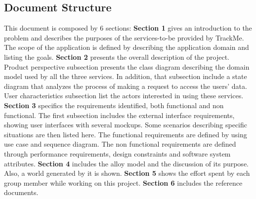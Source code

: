 \subsection{Document Structure}
This document is composed by 6 sections:
\bigbreak
\noindent
\textbf{Section 1} gives an introduction to the problem and describes the purposes of the services-to-be provided by TrackMe. The scope of the application is defined by describing the application domain and listing the goals.
\bigbreak
\noindent
\textbf{Section 2} presents the overall description of the project. Product perspective subsection presents the class diagram describing the domain model used by all the three services. In addition, that subsection include a state diagram that analyzes the process of making a request to access the users' data. User characteristics subsection list the actors interested in using these services.
\bigbreak
\noindent
\textbf{Section 3} specifics the requirements identified, both functional and non functional. The first subsection includes the external interface requirements, showing user interfaces with several mockups. Some scenarios describing specific situations are then listed here. The functional requirements are defined by using use case and sequence diagram. The non functional requirements are defined through performance requirements, design constraints and software system attributes.
\bigbreak
\noindent
\textbf{Section 4} includes the alloy model and the discussion of its purpose. Also, a world generated by it is shown.
\bigbreak
\noindent
\textbf{Section 5} shows the effort spent by each group member while working on this project.
\bigbreak
\noindent
\textbf {Section 6} includes the reference documents.
\clearpage
